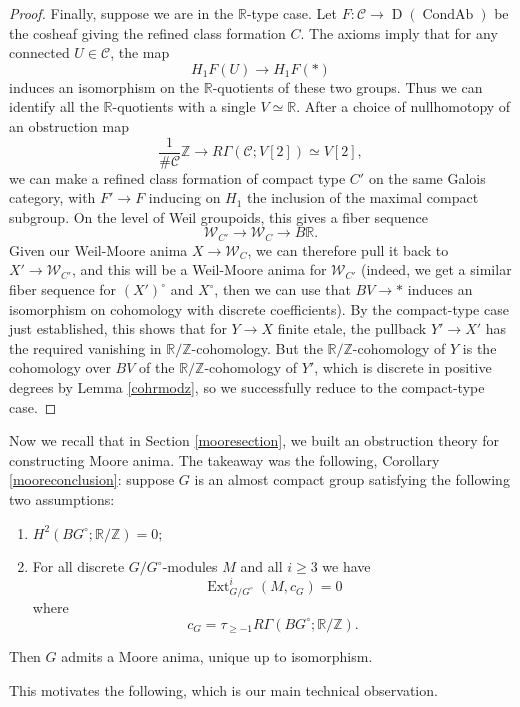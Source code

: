 \documentclass[12pt]{article}
\theoremstyle{definition}
\newcommand{\on}{\operatorname}
\newcommand{\mc}{\mathcal}
\newcommand{\mbb}{\mathbb}
\begin{document}
\begin{proof}
Finally, suppose we are in the $\mbb{R}$-type case.  Let $F:\mc{C}\to\on{D}(\on{CondAb})$ be the cosheaf giving the refined class formation $C$.  The axioms imply that for any connected $U\in\mc{C}$, the map
$$H_1F(U) \to H_1F(\ast)$$
induces an isomorphism on the $\mbb{R}$-quotients of these two groups.  Thus we can identify all the $\mbb{R}$-quotients with a single $V\simeq\mbb{R}$.  After a choice of nullhomotopy of an obstruction map
$$\frac{1}{\#\mc{C}}\mbb{Z} \to R\Gamma(\mc{C};V[2])\simeq V[2],$$
we can make a refined class formation of compact type $C'$ on the same Galois category, with $F'\to F$ inducing on $H_1$ the inclusion of the maximal compact subgroup.  On the level of Weil groupoids, this gives a fiber sequence
$$\mc{W}_{C'} \to \mc{W}_C \to B\mbb{R}.$$
Given our Weil-Moore anima $X\to \mc{W}_C$, we can therefore pull it back to $X'\to\mc{W}_{C'}$, and this will be a Weil-Moore anima for $\mc{W}_{C'}$ (indeed, we get a similar fiber sequence for $(X')^\circ$ and $X^\circ$, then we can use that $BV\to\ast$ induces an isomorphism on cohomology with discrete coefficients).  By the compact-type case just established, this shows that for $Y\to X$ finite etale, the pullback $Y'\to X'$ has the required vanishing in $\mbb{R}/\mbb{Z}$-cohomology.  But the $\mbb{R}/\mbb{Z}$-cohomology of $Y$ is the cohomology over $BV$ of the $\mbb{R}/\mbb{Z}$-cohomology of $Y'$, which is discrete in positive degrees by Lemma \ref{cohrmodz}, so we successfully reduce to the compact-type case.
\end{proof}

Now we recall that in Section \ref{mooresection}, we built an obstruction theory for constructing Moore anima.  The takeaway was the following, Corollary \ref{mooreconclusion}: suppose $G$ is an almost compact group satisfying the following two assumptions:
\begin{enumerate}
\item $H^2(BG^\circ;\mbb{R}/\mbb{Z})=0$;
\item For all discrete $G/G^\circ$-modules $M$ and all $i\geq 3$ we have
$$\on{Ext}^i_{G/G^\circ}(M,c_G)=0$$
where
$$c_G = \tau_{\geq -1} R\Gamma(BG^\circ;\mbb{R}/\mbb{Z}).$$
\end{enumerate}
Then $G$ admits a Moore anima, unique up to isomorphism.


This motivates the following, which is our main technical observation.
\end{document}

